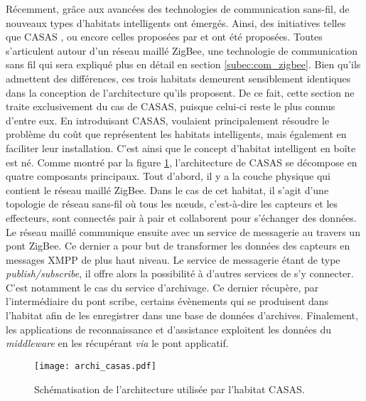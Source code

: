 Récemment, grâce aux avancées des technologies de communication sans-fil, de nouveaux types d'habitats intelligents ont émergés. Ainsi, des initiatives telles que CASAS \citep{Cook2013}, ou encore celles proposées par \cite{Zhihua2016} et \cite{Zhenyu2011} ont été proposées. Toutes s'articulent autour d'un réseau maillé ZigBee, une technologie de communication sans fil qui sera expliqué plus en détail en section \ref{subec:com_zigbee}. Bien qu'ils admettent des différences, ces trois habitats demeurent sensiblement identiques dans la conception de l'architecture qu'ils proposent. De ce fait, cette section ne traite exclusivement du cas de CASAS, puisque celui-ci reste le plus connus d'entre eux. En introduisant CASAS, \cite{Cook2013} voulaient principalement résoudre le problème du coût que représentent les habitats intelligents, mais également en faciliter leur installation. C'est ainsi que le concept d'habitat intelligent en boîte est né. Comme montré par la figure \ref{fig:archi_casas}, l'architecture de CASAS se décompose en quatre composants principaux. Tout d'abord, il y a la couche physique qui contient le réseau maillé ZigBee. Dans le cas de cet habitat, il s'agit d'une topologie de réseau sans-fil où tous les n\oe{}uds, c'est-à-dire les capteurs et les effecteurs, sont connectés pair à pair et collaborent pour s'échanger des données. Le réseau maillé communique ensuite avec un service de messagerie au travers un pont ZigBee. Ce dernier a pour but de transformer les données des capteurs en messages \ac{XMPP} de plus haut niveau. Le service de messagerie étant de type \textit{publish/subscribe}, il offre alors la possibilité à d'autres services de s'y connecter. C'est notamment le cas du service d'archivage. Ce dernier récupère, par l'intermédiaire du pont scribe, certains évènements qui se produisent dans l'habitat afin de les enregistrer dans une base de données d'archives. Finalement, les applications de reconnaissance et d'assistance exploitent les données du \textit{middleware} en les récupérant \textit{via} le pont applicatif.

\begin{figure}[H]
	\centering
	\texttt{[image: archi\_casas.pdf]}
	\caption{Schématisation de l'architecture utilisée par l'habitat CASAS.}
	\label{fig:archi_casas}
\end{figure}

